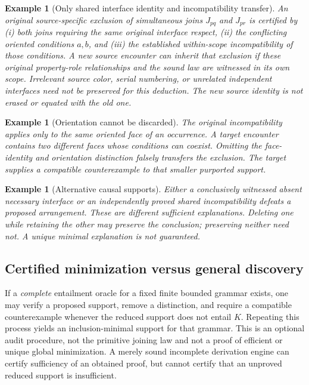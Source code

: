 \documentclass[11pt]{article}
\newtheorem{example}[definition]{Example}
\begin{document}
\begin{example}[Only shared interface identity and incompatibility transfer]
An original source-specific exclusion of simultaneous
joins $J_{pq}$ and $J_{pr}$ is certified by (i) both
joins requiring the same original interface respect,
(ii) the conflicting oriented conditions $a,b$, and
(iii) the established within-scope incompatibility
of those conditions. A new source encounter can
inherit that exclusion if these original
property-role relationships and the sound law are
witnessed in its own scope. Irrelevant source color,
serial numbering, or unrelated independent interfaces
need not be preserved for \emph{this} deduction.
The new source identity is not erased or equated
with the old one.
\end{example}

\begin{example}[Orientation cannot be discarded]
The original incompatibility applies only to the
same oriented face of an occurrence. A target
encounter contains two different faces whose
conditions can coexist. Omitting the face-identity
and orientation distinction falsely transfers
the exclusion. The target supplies a compatible
counterexample to that smaller purported support.
\end{example}

\begin{example}[Alternative causal supports]
Either a conclusively witnessed absent necessary
interface or an independently proved shared
incompatibility defeats a proposed arrangement.
These are different sufficient explanations.
Deleting one while retaining the other may
preserve the conclusion; preserving neither
need not. A unique minimal explanation is not
guaranteed.
\end{example}

\subsection{Certified minimization versus general discovery}
If a \emph{complete} entailment oracle for a fixed finite
bounded grammar exists, one may verify a proposed support,
remove a distinction, and require a compatible
counterexample whenever the reduced support does not
entail $K$. Repeating this process yields an
inclusion-minimal support for that grammar.
This is an optional audit procedure, not the
primitive joining law and not a proof of efficient
or unique global minimization. A merely sound
incomplete derivation engine can certify sufficiency
of an obtained proof, but cannot certify that
an unproved reduced support is insufficient.
\end{document}

